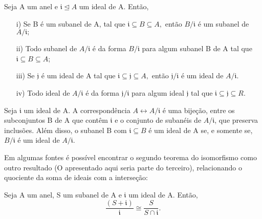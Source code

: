 \documentclass[algebraII_notes.tex]{subfiles}
\begin{document}
\begin{theorem*}
	Seja A um anel e \(\mathfrak{i} \trianglelefteq{A}\) um ideal de A. Então,
	\begin{itemize}
		\item[i)] Se B é um subanel de A, tal que \(\mathfrak{i}\subseteq B\subseteq A,\) então \(B/\mathfrak{i}\) é um
		      subanel de \(A/\mathfrak{i};\)
		\item[ii)] Todo subanel de \(A/\mathfrak{i}\) é da forma \(B/\mathfrak{i}\) para algum subanel B de A tal que
		      \(\mathfrak{i} \subseteq B \subseteq A\);
		\item[iii)] Se \(\mathfrak{j}\) é um ideal de A tal que \(\mathfrak{i}\subseteq \mathfrak{j}\subseteq A,\) então
		      \(\mathfrak{j}/\mathfrak{i}\) é um ideal de \(A/\mathfrak{i}.\)
		\item[iv)] Todo ideal de \(A/\mathfrak{i}\) é da forma \(\mathfrak{j}/\mathfrak{i}\) para algum ideal \(\mathfrak{j}\) tal que
		      \(\mathfrak{i}\subseteq \mathfrak{j}\subseteq R.\)
	\end{itemize}
\end{theorem*}
\begin{theorem*}
	Seja \(\mathfrak{i}\) um ideal de A. A correspondência \(A\longleftrightarrow A/\mathfrak{i}\) é uma bijeção, entre os subconjuntos B de A que contêm \(\mathfrak{i}\) e o
	conjunto de subanéis de \(A/\mathfrak{i}\), que preserva inclusões. Além disso, o subanel B com \(\mathfrak{i} \subseteq B\) é um ideal de A se, e somente se,
	\(B/\mathfrak{i}\) é um ideal de \(A/\mathfrak{i}\).
\end{theorem*}
Em algumas fontes é possível encontrar o segundo teorema do isomorfismo como outro resultado (O apresentado aqui seria parte do terceiro), relacionando o quociente da soma de ideais
com a interseção:
\begin{theorem*}
	Seja A um anel, S um subanel de A e \(\mathfrak{i}\) um ideal de A. Então,
	\[
		\frac{(S+\mathfrak{i})}{\mathfrak{i}}\cong{\frac{S}{S\cap \mathfrak{i}}}.
	\]
\end{theorem*}
\end{document}
